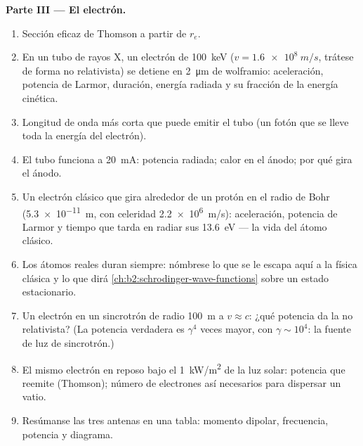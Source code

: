 \begin{problem}
\medskip
\noindent\textbf{Parte III --- El electrón.}
\begin{enumerate}[resume]
  \item Sección eficaz de Thomson a partir de $r_e$.
  \item En un tubo de rayos X, un electrón de \qty{100}{keV} ($v = \qty{1.6e8}{m/s}$,
        trátese de forma no relativista) se detiene en \qty{2}{\micro m} de
        wolframio: aceleración, potencia de Larmor, duración, energía
        radiada y su fracción de la energía cinética.
  \item Longitud de onda más corta que puede emitir el tubo (un fotón que se lleve
        toda la energía del electrón).
  \item El tubo funciona a \qty{20}{mA}: potencia radiada; calor en el ánodo;
        por qué gira el ánodo.
  \item Un electrón clásico que gira alrededor de un protón en el radio de Bohr
        (\qty{5.3e-11}{m}, con celeridad \qty{2.2e6}{m/s}): aceleración, potencia de
        Larmor y tiempo que tarda en radiar sus \qty{13.6}{eV} --- la
        vida del átomo clásico.
  \item Los átomos reales duran siempre: nómbrese lo que se le escapa aquí a la
        física clásica y lo que dirá \cref{ch:b2:schrodinger-wave-functions}
        sobre un estado estacionario.
  \item Un electrón en un sincrotrón de radio \qty{100}{m} a $v \approx c$:
        ¿qué potencia da la  no relativista? (La
        potencia verdadera es $\gamma^4$ veces mayor, con $\gamma \sim 10^4$: la
        fuente de luz de sincrotrón.)
  \item El mismo electrón en reposo bajo el \qty{1}{kW/m^2} de la luz solar:
        potencia que reemite (Thomson); número de electrones así
        necesarios para dispersar un vatio.
  \item Resúmanse las tres antenas en una tabla: momento dipolar,
        frecuencia, potencia y diagrama.
\end{enumerate}
\end{problem}
